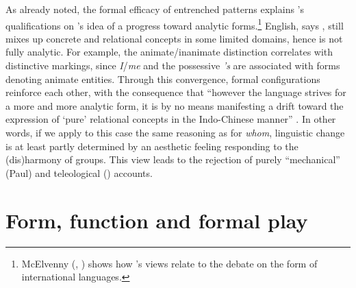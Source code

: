 \documentclass[output=paper]{langscibook}
\begin{document}
As already noted, the formal efficacy of entrenched patterns explains {\Sapir}'s qualifications on {\Jespersen}'s idea of a progress toward analytic forms.\footnote{McElvenny (\citeyear{McElvenny2013}, \citeyear{McElvenny2017b}) shows how {\Jespersen}'s views relate to the debate on the form of international languages.} English, says {\Sapir}, still mixes up concrete and relational concepts in some limited domains, hence is not fully analytic. For example, the animate/inanimate distinction correlates with distinctive markings, since \emph{I}/\emph{me} and the possessive \emph{'s} are associated with forms denoting animate entities. Through this convergence, formal configurations reinforce each other, with the consequence that ``however the language strives for a more and more analytic form, it is by no means manifesting a drift toward the expression of `pure' relational concepts in the Indo-Chinese manner'' \citep[168]{Sapir1921}. In other words, if we apply to this case the same reasoning as for \emph{whom}, linguistic change is at least partly determined by an aesthetic feeling responding to the (dis)harmony of groups. This view leads to the rejection of purely ``mechanical'' (Paul) and teleological ({\Jespersen}) accounts.

\section{Form, function and formal play}
\label{sec:fortis:formalplay}
\end{document}
